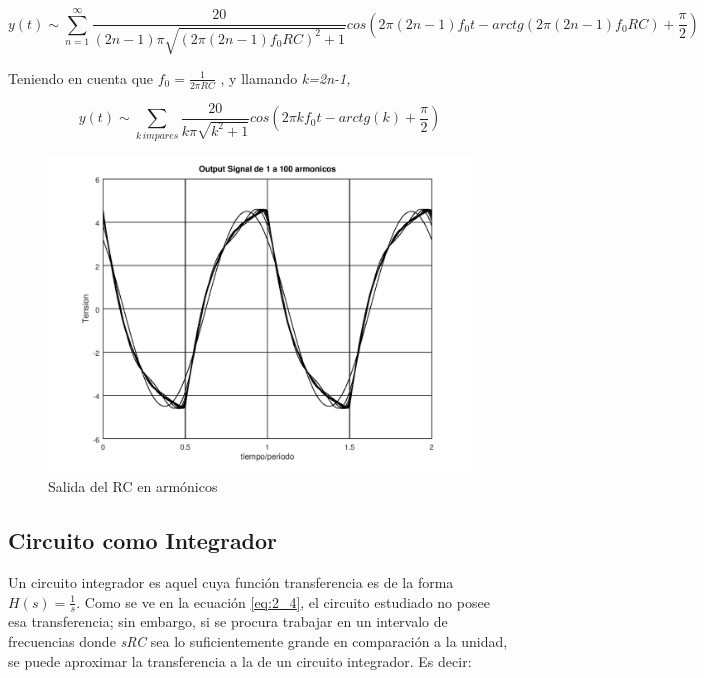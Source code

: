 \begin{equation}
y(t)\sim\sum_{n=1}^{\infty}\frac{20}{(2n-1)\pi\sqrt{\left(2\pi(2n-1)f_{0}RC\right)^{2}+1}}cos\left(2\pi(2n-1)f_{0}t-arctg\left(2\pi(2n-1)f_{0}RC\right)+\frac{\pi}{2}\right)\label{eq:2_3}
\end{equation}

Teniendo en cuenta que $f_{0}=\frac{1}{2\pi RC}$ , y llamando \emph{k=2n-1,
}

\[
y(t)\sim\sum_{k\,impares}\frac{20}{k\pi\sqrt{k^{2}+1}}cos\left(2\pi kf_{0}t-arctg\left(k\right)+\frac{\pi}{2}\right)
\]

\begin{figure}[H]
\begin{centering}
\includegraphics[scale=0.5]{../Ex2/resources2/out_calc} 
\par\end{centering}
\caption{Salida del RC en armónicos}
\label{2_3} 
\end{figure}

\subsection{Circuito como Integrador}

Un circuito integrador es aquel cuya
función transferencia es de la forma $H(s)=\frac{1}{s}$. Como se ve en la ecuación
\ref{eq:2_4}, el circuito estudiado no posee esa transferencia; sin embargo,
si se procura trabajar en un intervalo de frecuencias donde \emph{sRC }sea lo suficientemente
grande en comparación a la unidad, se puede aproximar la transferencia a la de un circuito integrador. Es decir:

